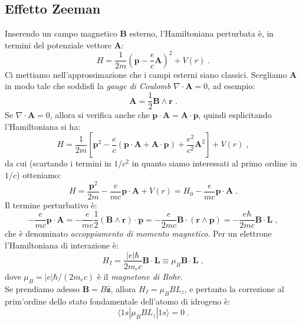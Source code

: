 \documentclass[12pt,a4paper]{report}
\theoremstyle{definition}
\numberwithin{equation}{section}
\newcommand{\bra}{\langle}
\newcommand{\ket}{\rangle}
\begin{document}
\subsection{Effetto Zeeman}
Inserendo un campo magnetico $\mathbf{B}$ esterno, l'Hamiltoniana perturbata è, in termini del potenziale vettore $\mathbf{A}$:
\begin{equation}
H=\frac{1}{2m}\left(\mathbf{p}-\frac{e}{c}\mathbf{A}\right)^2+V(r)\;.
\end{equation}
Ci mettiamo nell'approssimazione che i campi esterni siano classici. Scegliamo $\mathbf{A}$ in modo tale che soddisfi la \textit{gauge di Coulomb} $\nabla\cdot\mathbf{A}=0$, ad esempio:
\begin{equation}
\mathbf{A}=\frac{1}{2}\mathbf{B}\wedge \mathbf{r}\;.
\end{equation}
Se $\nabla\cdot \mathbf{A}=0$, allora si verifica anche che $\mathbf{p}\cdot\mathbf{A}=\mathbf{A}\cdot\mathbf{p}$, quindi esplicitando l'Hamiltoniana si ha:
\begin{equation}
H=\frac{1}{2m}\left[\mathbf{p}^2-\frac{e}{c}(\mathbf{p}\cdot\mathbf{A}+\mathbf{A}\cdot\mathbf{p})+\frac{e^2}{c^2}\mathbf{A}^2\right]+V(r)\;,
\end{equation}
da cui (scartando i termini in $1/c^2$ in quanto siamo interessati al primo ordine in $1/c$) otteniamo:
\begin{equation}
H=\frac{\mathbf{p}^2}{2m}-\frac{e}{mc}\mathbf{p}\cdot\mathbf{A}+V(r)=H_0-\frac{e}{mc}\mathbf{p}\cdot\mathbf{A}\;.
\end{equation}
Il termine perturbativo è:
\begin{equation}
-\frac{e}{mc}\mathbf{p}\cdot\mathbf{A}=-\frac{e}{mc}\frac{1}{2}(\mathbf{B}\wedge\mathbf{r})\cdot\mathbf{p}=-\frac{e}{2mc}\mathbf{B}\cdot(\mathbf{r}\wedge\mathbf{p})=-\frac{e\hbar}{2mc}\mathbf{B}\cdot\mathbf{L}\;,
\end{equation}
che è denominato \textit{accoppiamento di momento magnetico}. Per un elettrone l'Hamiltoniana di interazione è:
\begin{equation}
H_I=\frac{|e|\hbar}{2m_ec}\mathbf{B}\cdot\mathbf{L}\equiv \mu_B\mathbf{B}\cdot\mathbf{L}\;,
\end{equation}
dove $\mu_B=|e|\hbar/(2m_ec)$ è il \textit{magnetone di Bohr}. \\
Se prendiamo adesso $\mathbf{B}=B\hat{\mathbf{z}}$, allora $H_I=\mu_BBL_z$, e pertanto la correzione al prim'ordine dello stato fondamentale dell'atomo di idrogeno è:
\begin{equation}
\bra 1s|\mu_BBL_z|1s\ket=0\;.
\end{equation}
\end{document}
